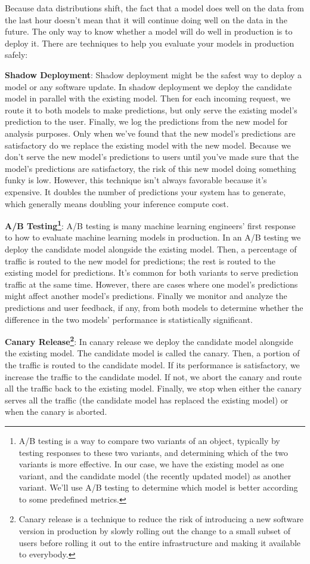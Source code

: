 Because data distributions shift, the fact that a model does well on the data from the last hour doesn't mean that it
will continue doing well on the data in the future. The only way to know whether a model will do well in production
is to deploy it. There are techniques to help you evaluate your models in production safely:
\bit
\item \textbf{Shadow Deployment}: Shadow deployment might be the safest way to deploy a model or any software update.
In shadow deployment we deploy the candidate model in parallel with the existing model. Then for each incoming
request, we route it to both models to make predictions, but only serve the existing model's prediction to the user.
Finally, we log the predictions from the new model for analysis purposes. Only when we've found that the new model's
predictions are satisfactory do we replace the existing model with the new model. Because we don't serve the new
model's predictions to users until you've made sure that the model's predictions are satisfactory, the risk of this
new model doing something funky is low. However, this technique isn't always favorable because it's expensive. It
doubles the number of predictions your system has to generate, which generally means doubling your inference compute
cost.
\item \textbf{A/B Testing\footnote{A/B testing is a way to compare two variants of an object, typically by testing
responses to these two variants, and determining which of the two variants is more effective. In our case, we have
the existing model as one variant, and the candidate model (the recently updated model) as another variant. We'll use
A/B testing to determine which model is better according to some predefined metrics.}}: A/B testing is many machine
learning engineers' first response to how to evaluate machine learning models in production. In an A/B testing we
deploy the candidate model alongside the existing model. Then, a percentage of traffic is routed to the new model for
predictions; the rest is routed to the existing model for predictions. It's common for both variants to serve
prediction traffic at the same time. However, there are cases where one model's predictions might affect another
model's predictions. Finally we monitor and analyze the predictions and user feedback, if any, from both models to
determine whether the difference in the two models' performance is statistically significant.
\item \textbf{Canary Release\footnote{Canary release is a technique to reduce the risk of introducing a new software
version in production by slowly rolling out the change to a small subset of users before rolling it out to the entire
infrastructure and making it available to everybody.}}: In canary release we deploy the candidate model alongside the
existing model. The candidate model is called the canary. Then, a portion of the traffic is routed to the candidate
model. If its performance is satisfactory, we increase the traffic to the candidate model. If not, we abort the
canary and route all the traffic back to the existing model. Finally, we stop when either the canary serves all the
traffic (the candidate model has replaced the existing model) or when the canary is aborted.
\eit

